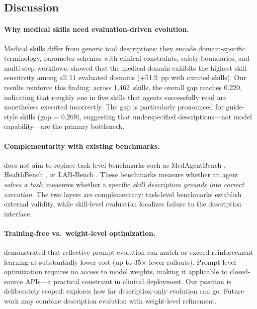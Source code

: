 \subsection{Discussion}
\label{ssec:discussion}

\paragraph{Why medical skills need evaluation-driven evolution.}
Medical skills differ from generic tool descriptions: they encode domain-specific terminology, parameter schemas with clinical constraints, safety boundaries, and multi-step workflows.
\citet{skillsbench2026} showed that the medical domain exhibits the highest skill sensitivity among all 11 evaluated domains (+51.9~pp with curated skills).
Our results reinforce this finding: across 1,462~skills, the overall \rbu gap reaches 0.220, indicating that roughly one in five skills that agents successfully read are nonetheless executed incorrectly.
The gap is particularly pronounced for guide-style skills (\rbu gap = 0.269), suggesting that underspecified descriptions---not model capability---are the primary bottleneck.

\paragraph{Complementarity with existing benchmarks.}
\medskille does not aim to replace task-level benchmarks such as MedAgentBench \citep{medagentbench2025}, HealthBench \citep{healthbench2025}, or LAB-Bench \citep{labbench2024}.
These benchmarks measure whether an agent \emph{solves a task}; \medskillbench measures whether a specific \emph{skill description grounds into correct execution}.
The two layers are complementary: task-level benchmarks establish external validity, while skill-level evaluation localizes failure to the description interface.

\paragraph{Training-free vs.\ weight-level optimization.}
\citet{gepa2025} demonstrated that reflective prompt evolution can match or exceed reinforcement learning at substantially lower cost (up to 35$\times$ fewer rollouts).
Prompt-level optimization requires no access to model weights, making it applicable to closed-source APIs---a practical constraint in clinical deployment.
Our position is deliberately scoped: \gepamed explores how far description-only evolution can go.
Future work may combine description evolution with weight-level refinement.
